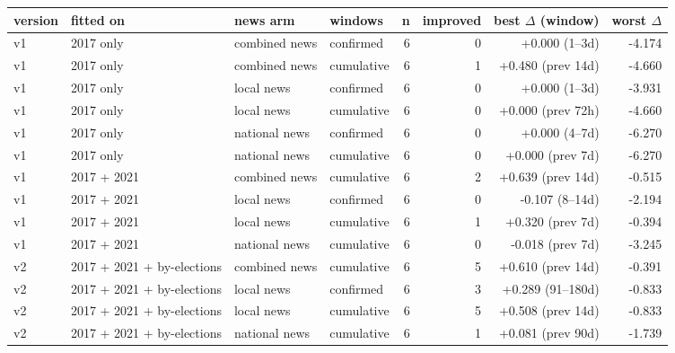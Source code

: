 \begin{tabular}{llllrrrr}
\toprule
version & fitted on & news arm & windows & n & improved & best $\Delta$ (window) & worst $\Delta$ \\
\midrule
v1 & 2017 only & combined news & confirmed & 6 & 0 & +0.000 (1--3d) & -4.174 \\
v1 & 2017 only & combined news & cumulative & 6 & 1 & +0.480 (prev 14d) & -4.660 \\
v1 & 2017 only & local news & confirmed & 6 & 0 & +0.000 (1--3d) & -3.931 \\
v1 & 2017 only & local news & cumulative & 6 & 0 & +0.000 (prev 72h) & -4.660 \\
v1 & 2017 only & national news & confirmed & 6 & 0 & +0.000 (4--7d) & -6.270 \\
v1 & 2017 only & national news & cumulative & 6 & 0 & +0.000 (prev 7d) & -6.270 \\
v1 & 2017 + 2021 & combined news & cumulative & 6 & 2 & +0.639 (prev 14d) & -0.515 \\
v1 & 2017 + 2021 & local news & confirmed & 6 & 0 & -0.107 (8--14d) & -2.194 \\
v1 & 2017 + 2021 & local news & cumulative & 6 & 1 & +0.320 (prev 7d) & -0.394 \\
v1 & 2017 + 2021 & national news & cumulative & 6 & 0 & -0.018 (prev 7d) & -3.245 \\
v2 & 2017 + 2021 + by-elections & combined news & cumulative & 6 & 5 & +0.610 (prev 14d) & -0.391 \\
v2 & 2017 + 2021 + by-elections & local news & confirmed & 6 & 3 & +0.289 (91--180d) & -0.833 \\
v2 & 2017 + 2021 + by-elections & local news & cumulative & 6 & 5 & +0.508 (prev 14d) & -0.833 \\
v2 & 2017 + 2021 + by-elections & national news & cumulative & 6 & 1 & +0.081 (prev 90d) & -1.739 \\
\bottomrule
\end{tabular}

